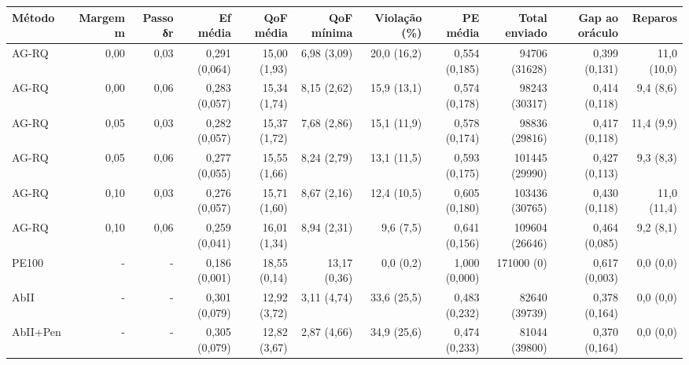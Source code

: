 \begin{tabular}{lrrrrrrrrrr}
\toprule
Método & Margem m & Passo δr & Ef média & QoF média & QoF mínima & Violação (\%) & PE média & Total enviado & Gap ao oráculo & Reparos \\
\midrule
AG-RQ & 0{,}00 & 0{,}03 & 0{,}291 (0{,}064) & 15{,}00 (1{,}93) & 6{,}98 (3{,}09) & 20{,}0 (16{,}2) & 0{,}554 (0{,}185) & 94706 (31628) & 0{,}399 (0{,}131) & 11{,}0 (10{,}0) \\
AG-RQ & 0{,}00 & 0{,}06 & 0{,}283 (0{,}057) & 15{,}34 (1{,}74) & 8{,}15 (2{,}62) & 15{,}9 (13{,}1) & 0{,}574 (0{,}178) & 98243 (30317) & 0{,}414 (0{,}118) & 9{,}4 (8{,}6) \\
AG-RQ & 0{,}05 & 0{,}03 & 0{,}282 (0{,}057) & 15{,}37 (1{,}72) & 7{,}68 (2{,}86) & 15{,}1 (11{,}9) & 0{,}578 (0{,}174) & 98836 (29816) & 0{,}417 (0{,}118) & 11{,}4 (9{,}9) \\
AG-RQ & 0{,}05 & 0{,}06 & 0{,}277 (0{,}055) & 15{,}55 (1{,}66) & 8{,}24 (2{,}79) & 13{,}1 (11{,}5) & 0{,}593 (0{,}175) & 101445 (29990) & 0{,}427 (0{,}113) & 9{,}3 (8{,}3) \\
AG-RQ & 0{,}10 & 0{,}03 & 0{,}276 (0{,}057) & 15{,}71 (1{,}60) & 8{,}67 (2{,}16) & 12{,}4 (10{,}5) & 0{,}605 (0{,}180) & 103436 (30765) & 0{,}430 (0{,}118) & 11{,}0 (11{,}4) \\
AG-RQ & 0{,}10 & 0{,}06 & 0{,}259 (0{,}041) & 16{,}01 (1{,}34) & 8{,}94 (2{,}31) & 9{,}6 (7{,}5) & 0{,}641 (0{,}156) & 109604 (26646) & 0{,}464 (0{,}085) & 9{,}2 (8{,}1) \\
PE100 & - & - & 0{,}186 (0{,}001) & 18{,}55 (0{,}14) & 13{,}17 (0{,}36) & 0{,}0 (0{,}2) & 1{,}000 (0{,}000) & 171000 (0) & 0{,}617 (0{,}003) & 0{,}0 (0{,}0) \\
AbII & - & - & 0{,}301 (0{,}079) & 12{,}92 (3{,}72) & 3{,}11 (4{,}74) & 33{,}6 (25{,}5) & 0{,}483 (0{,}232) & 82640 (39739) & 0{,}378 (0{,}164) & 0{,}0 (0{,}0) \\
AbII+Pen & - & - & 0{,}305 (0{,}079) & 12{,}82 (3{,}67) & 2{,}87 (4{,}66) & 34{,}9 (25{,}6) & 0{,}474 (0{,}233) & 81044 (39800) & 0{,}370 (0{,}164) & 0{,}0 (0{,}0) \\
\bottomrule
\end{tabular}
